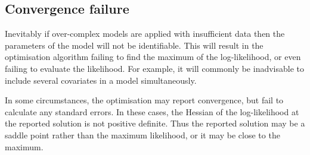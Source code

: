 \subsection{Convergence failure}
\label{sec:failure}

Inevitably if over-complex models are applied with insufficient data
then the parameters of the model will not be identifiable.  This will
result in the optimisation algorithm failing to find the maximum of
the log-likelihood, or even failing to evaluate the likelihood. For
example, it will commonly be inadvisable to include several covariates
in a model simultaneously.

In some circumstances, the optimisation may report convergence, but
fail to calculate any standard errors.  In these cases, the Hessian of
the log-likelihood at the reported solution is not positive definite.
Thus the reported solution may be a saddle point rather than the
maximum likelihood, or it may be close to the maximum.

